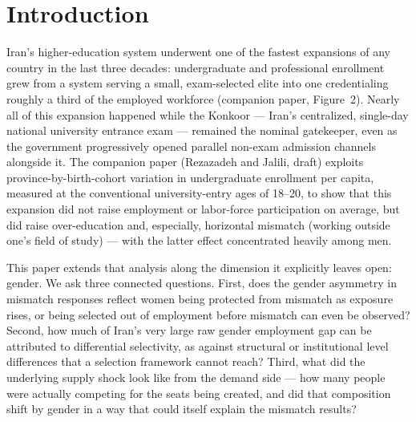 \documentclass[11pt]{article}
\begin{document}
\begin{abstract}
\vspace{6pt}
\noindent\textbf{JEL codes:} I23, I24, J16, J21, J24, O15\\
\textbf{Keywords:} educational mismatch, over-education, horizontal mismatch, university expansion, gender gap, selection into employment, Iran
\end{abstract}

\section{Introduction}

Iran's higher-education system underwent one of the fastest expansions of any country in the last three decades: undergraduate and professional enrollment grew from a system serving a small, exam-selected elite into one credentialing roughly a third of the employed workforce (companion paper, Figure~2). Nearly all of this expansion happened while the Konkoor --- Iran's centralized, single-day national university entrance exam --- remained the nominal gatekeeper, even as the government progressively opened parallel non-exam admission channels alongside it. The companion paper (Rezazadeh and Jalili, draft) exploits province-by-birth-cohort variation in undergraduate enrollment per capita, measured at the conventional university-entry ages of 18--20, to show that this expansion did not raise employment or labor-force participation on average, but did raise over-education and, especially, horizontal mismatch (working outside one's field of study) --- with the latter effect concentrated heavily among men.

This paper extends that analysis along the dimension it explicitly leaves open: gender. We ask three connected questions. First, does the gender asymmetry in mismatch responses reflect women being protected from mismatch as exposure rises, or being selected out of employment before mismatch can even be observed? Second, how much of Iran's very large raw gender employment gap can be attributed to differential selectivity, as against structural or institutional level differences that a selection framework cannot reach? Third, what did the underlying supply shock look like from the demand side --- how many people were actually competing for the seats being created, and did that composition shift by gender in a way that could itself explain the mismatch results?
\end{document}
